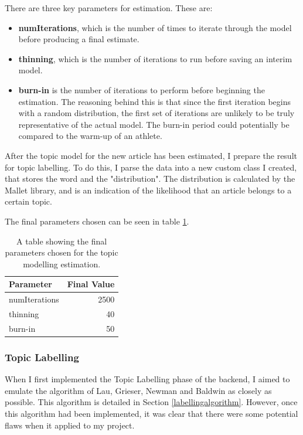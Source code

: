 \documentclass[12pt]{article}
\begin{document}
There are three key parameters for estimation. These are:

\begin{itemize}
	\item \textbf{numIterations}, which is the number of times to iterate through the model before producing a final estimate. 
	\item \textbf{thinning}, which is the number of iterations to run before saving an interim model.
	\item \textbf{burn-in} is the number of iterations to perform before beginning the estimation. The reasoning behind this is that since the first iteration begins with a random distribution, the first set of iterations are unlikely to be truly representative of the actual model. The burn-in period could potentially be compared to the warm-up of an athlete. 
\end{itemize}

After the topic model for the new article has been estimated, I prepare the result for topic labelling. To do this, I parse the data into a new custom class I created, that stores the word and the "distribution". The distribution is calculated by the Mallet library, and is an indication of the likelihood that an article belongs to a certain topic.

The final parameters chosen can be seen in table \ref{topicmodellingestimation}.

\begin{table}[H]
	\centering
	\begin{tabular}{l|r}
		\textbf{Parameter} & \textbf{Final Value} \\ \hline
		numIterations & 2500 \\ \hline
		thinning & 40 \\ \hline
		burn-in & 50 \\ \hline
	\end{tabular}
	\caption[Parameters for estimating topic models]{A table showing the final parameters chosen for the topic modelling estimation.}
	\label{topicmodellingestimation}
\end{table}

\subsubsection{Topic Labelling}

When I first implemented the Topic Labelling phase of the backend, I aimed to emulate the algorithm of Lau, Grieser, Newman and Baldwin \cite{topicLabelling} as closely as possible. This algorithm is detailed in Section \ref{labellingalgorithm}. However, once this algorithm had been implemented, it was clear that there were some potential flaws when it applied to my project.
\end{document}

